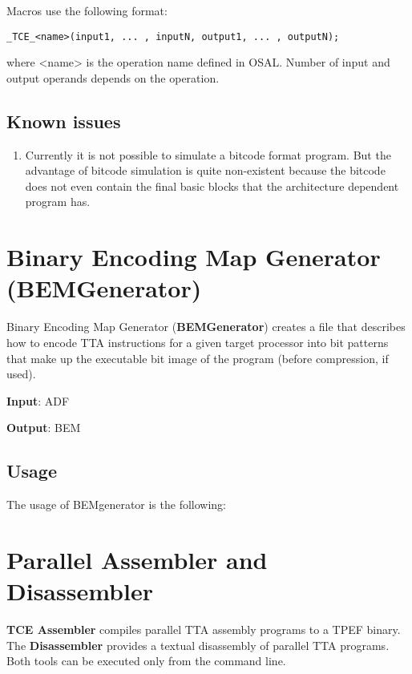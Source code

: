 \documentclass[twoside]{tceusermanual}
\begin{document}
Macros use the following format:
\begin{verbatim}
_TCE_<name>(input1, ... , inputN, output1, ... , outputN);
\end{verbatim}
where <name> is the operation name defined in OSAL. Number of input and
output operands depends on the operation.


\subsection{Known issues}
\label{sec:tceccIssues}
\begin{enumerate}

\item
Currently it is not possible to simulate a bitcode format program. But the
advantage of bitcode simulation is quite non-existent because the bitcode
does not even contain the final basic blocks that the architecture dependent
program has.
\end{enumerate}



\section{Binary Encoding Map Generator (BEMGenerator)}
\label{section:bemgen}
Binary Encoding Map Generator (\textbf{BEMGenerator}) creates a file that
describes how to encode TTA instructions for a given target processor into
bit patterns that make up the executable bit image of the program (before
compression, if used).

\textbf{Input}: ADF

\textbf{Output}: BEM

\subsection{Usage}

The usage of BEMgenerator is the following:


\section{Parallel Assembler and Disassembler}
\label{section:TCEAsm}

\textbf{TCE Assembler} compiles parallel TTA assembly programs to a TPEF
binary. The \textbf{Disassembler} provides a textual disassembly of
parallel TTA programs. Both tools can be executed only from the command
line.
\end{document}
